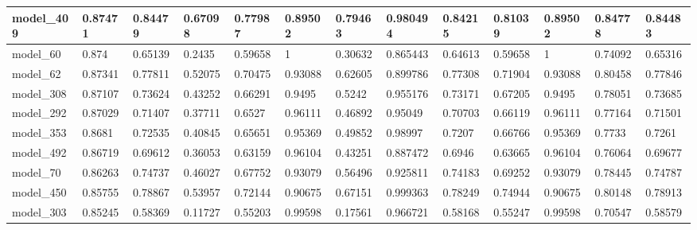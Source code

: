 \begin{tabular}{|l|l|l|l|l|l|l|l|l|l|l|l|l|}
model\_409     & 0.87471     & 0.84479        & 0.67098      & 0.77987          & 0.89502              & 0.79463              & 0.980494     & 0.84215           & 0.81039            & 0.89502         & 0.84778     & 0.84483      \\ \hline
model\_60      & 0.874       & 0.65139        & 0.2435       & 0.59658          & 1                    & 0.30632              & 0.865443     & 0.64613           & 0.59658            & 1               & 0.74092     & 0.65316      \\ \hline
model\_62      & 0.87341     & 0.77811        & 0.52075      & 0.70475          & 0.93088              & 0.62605              & 0.899786     & 0.77308           & 0.71904            & 0.93088         & 0.80458     & 0.77846      \\ \hline
model\_308     & 0.87107     & 0.73624        & 0.43252      & 0.66291          & 0.9495               & 0.5242               & 0.955176     & 0.73171           & 0.67205            & 0.9495          & 0.78051     & 0.73685      \\ \hline
model\_292     & 0.87029     & 0.71407        & 0.37711      & 0.6527           & 0.96111              & 0.46892              & 0.95049      & 0.70703           & 0.66119            & 0.96111         & 0.77164     & 0.71501      \\ \hline
model\_353     & 0.8681      & 0.72535        & 0.40845      & 0.65651          & 0.95369              & 0.49852              & 0.98997      & 0.7207            & 0.66766            & 0.95369         & 0.7733      & 0.7261       \\ \hline
model\_492     & 0.86719     & 0.69612        & 0.36053      & 0.63159          & 0.96104              & 0.43251              & 0.887472     & 0.6946            & 0.63665            & 0.96104         & 0.76064     & 0.69677      \\ \hline
model\_70      & 0.86263     & 0.74737        & 0.46027      & 0.67752          & 0.93079              & 0.56496              & 0.925811     & 0.74183           & 0.69252            & 0.93079         & 0.78445     & 0.74787      \\ \hline
model\_450     & 0.85755     & 0.78867        & 0.53957      & 0.72144          & 0.90675              & 0.67151              & 0.999363     & 0.78249           & 0.74944            & 0.90675         & 0.80148     & 0.78913      \\ \hline
model\_303     & 0.85245     & 0.58369        & 0.11727      & 0.55203          & 0.99598              & 0.17561              & 0.966721     & 0.58168           & 0.55247            & 0.99598         & 0.70547     & 0.58579      \\ \hline

\end{tabular}
